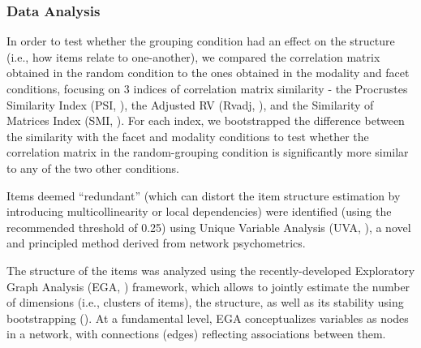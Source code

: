 \documentclass[
  man,
  floatsintext,
  longtable,
  nolmodern,
  notxfonts,
  notimes,
  mask,
  colorlinks=true,linkcolor=blue,citecolor=blue,urlcolor=blue]{apa7}
\begin{document}
\subsubsection{Data Analysis}\label{data-analysis}

In order to test whether the grouping condition had an effect on the
structure (i.e., how items relate to one-another), we compared the
correlation matrix obtained in the random condition to the ones obtained
in the modality and facet conditions, focusing on 3 indices of
correlation matrix similarity - the Procrustes Similarity Index (PSI,
), the Adjusted RV (Rvadj,
), and the
Similarity of Matrices Index (SMI,
). For each
index, we bootstrapped the difference between the similarity with the
facet and modality conditions to test whether the correlation matrix in
the random-grouping condition is significantly more similar to any of
the two other conditions.

Items deemed ``redundant'' (which can distort the item structure
estimation by introducing multicollinearity or local dependencies) were
identified (using the recommended threshold of 0.25) using Unique
Variable Analysis (UVA, ), a novel and principled method derived from network
psychometrics.

The structure of the items was analyzed using the recently-developed
Exploratory Graph Analysis (EGA, ) framework, which allows to jointly estimate
the number of dimensions (i.e., clusters of items), the structure, as
well as its stability using bootstrapping
(). At a
fundamental level, EGA conceptualizes variables as nodes in a network,
with connections (edges) reflecting associations between them.
\end{document}
